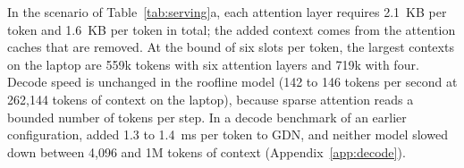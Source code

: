 In the scenario of Table~\ref{tab:serving}a, each attention layer requires 2.1~KB per token and
\ingram{} 1.6~KB per token in total; the added context comes from the attention caches that are
removed. At the bound of six slots per token, the largest contexts on the laptop are 559k tokens
with six attention layers and 719k with four. Decode speed is unchanged in the roofline model (142
to 146 tokens per second at 262,144 tokens of context on the laptop), because sparse attention
reads a bounded number of tokens per step. In a decode benchmark of an earlier configuration,
\ingram{} added 1.3 to 1.4~ms per token to GDN, and neither model slowed down between 4,096 and 1M
tokens of context (Appendix~\ref{app:decode}).

